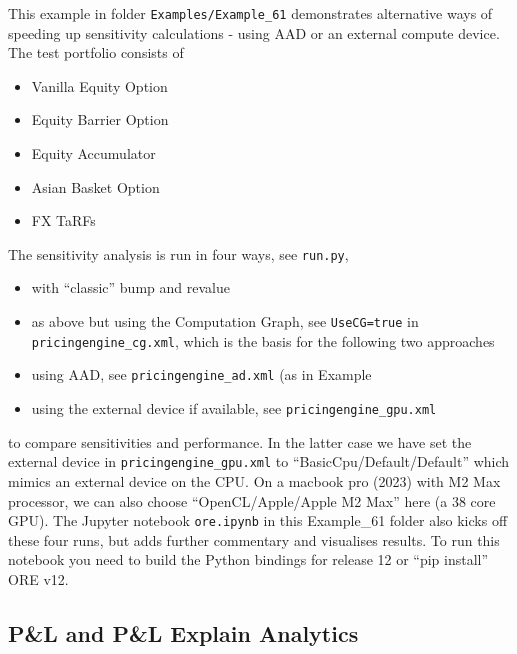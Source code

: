 This example in folder {\tt Examples/Example\_61} demonstrates alternative ways of speeding up sensitivity
calculations - using AAD or an external compute device.
The test portfolio consists of
\begin{itemize}
\item Vanilla Equity Option
\item Equity Barrier Option
\item Equity Accumulator
\item Asian Basket Option
\item FX TaRFs
\end{itemize}
The sensitivity analysis is run in four ways, see {\tt run.py},
\begin{itemize}
\item with ``classic'' bump and revalue
\item as above but using the Computation Graph, see {\tt UseCG=true} in {\tt pricingengine\_cg.xml}, which
  is the basis for the following two approaches
\item using AAD, see {\tt pricingengine\_ad.xml} (as in Example
\item using the external device if available, see {\tt pricingengine\_gpu.xml}
\end{itemize}
to compare sensitivities and performance. In the latter case we have set the external device in
{\tt pricingengine\_gpu.xml} to ``BasicCpu/Default/Default'' which mimics an external device on the CPU.
On a macbook pro (2023) with M2 Max processor, we can also choose
``OpenCL/Apple/Apple M2 Max'' here (a 38 core GPU).
The Jupyter notebook {\tt ore.ipynb} in this Example\_61 folder also kicks
off these four runs, but adds further commentary and visualises results.
To run this notebook you need to build the Python bindings for release 12
or ``pip install'' ORE v12.

\subsection{P\&L and P\&L Explain Analytics}%
\label{example:62}

